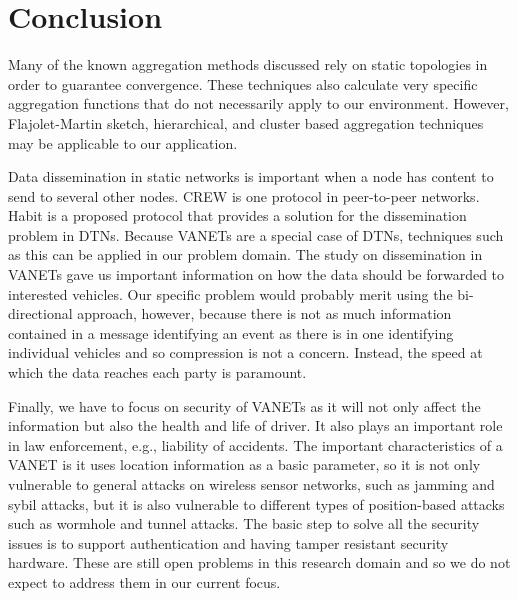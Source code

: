 \documentclass{IEEEtran}
\begin{document}
\section{Conclusion}

Many of the known aggregation methods discussed rely on static topologies in order to guarantee convergence. These techniques also calculate very specific aggregation functions that do not necessarily apply to our environment. However, Flajolet-Martin sketch, hierarchical, and cluster based aggregation techniques may be applicable to our application.

Data dissemination in static networks is important when a node has content to send to several other nodes. CREW is one protocol in peer-to-peer networks. Habit is a proposed protocol that provides a solution for the dissemination problem in DTNs. Because VANETs are a special case of DTNs, techniques such as this can be applied in our problem domain. The study on dissemination in VANETs gave us important information on how the data should be forwarded to interested vehicles.  Our specific problem would probably merit using the bi-directional approach, however, because there is not as much information contained in a message identifying an event as there is in one identifying individual vehicles and so compression is not a concern.  Instead, the speed at which the data reaches each party is paramount.

Finally, we have to focus on security of VANETs as it will not only affect the information but also the health and life of driver. It also plays an important role in law enforcement, e.g., liability of accidents. The important characteristics of a VANET is it uses location information as a basic parameter, so it is not only vulnerable to general attacks on wireless sensor networks, such as jamming and sybil attacks, but it is also vulnerable to different types of position-based attacks such as wormhole and tunnel attacks. The basic step to solve all the security issues is to support authentication and having tamper resistant security hardware.  These are still open problems in this research domain and so we do not expect to address them in our current focus.



\end{document}
